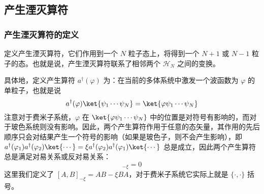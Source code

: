 \subsection{产生湮灭算符}
\subsubsection{产生湮灭算符的定义}
定义产生湮灭算符，它们作用到一个 $N$ 粒子态上，将得到一个 $N+1$ 或 $N-1$ 粒子的态。也就是说，产生湮灭算符联系了相邻两个 $\mathcal{H}_N$ 之间的变换。

具体地，定义产生算符 $a^\dagger(\varphi)$ 为：在当前的多体系统中激发一个波函数为 $\varphi$ 的单粒子，也就是说
\begin{equation}\label{eq_SecQua_3}
a^\dagger(\varphi)\ket{\psi_1\cdots\psi_N}=\ket{\varphi\psi_1\cdots\psi_N}
\end{equation}
注意对于费米子系统，$\varphi$ 在 $\ket{\varphi\psi_1\cdots\psi_N}$ 中的位置是对符号有影响的，而对于玻色系统则没有影响。因此，两个产生算符作用于任意的态矢量，其作用的先后顺序只会对结果产生一个符号的影响（如果是玻色子，则不会产生影响），即 $a^\dagger(\varphi_1)a^\dagger(\varphi_2)\ket{\cdots}=\xi a^\dagger(\varphi_2)a^\dagger(\varphi_1)\ket{\cdots}$ 总是成立，因此两个产生算符总是满足对易关系或反对易关系：
\begin{equation}
[a^\dagger(\varphi_1),a^\dagger(\varphi_2)]_{-\xi}=0
\end{equation}
这里我们定义了 $[A,B]_{-\xi}=AB-\xi BA$，对于费米子系统它实际上就是 $\{\cdot,\cdot \}$ 括号。


